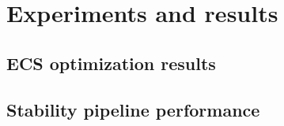 \chapter{Experiments and results}

\section{ECS optimization results}


\section{Stability pipeline performance}